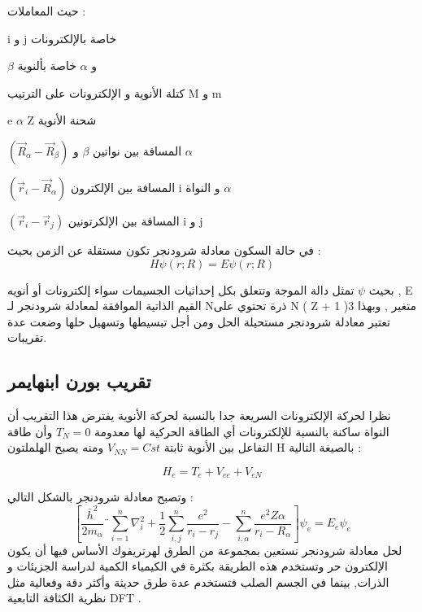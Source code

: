 حيث المعاملات :
\begin{list}{}{}
	
	\item 
	i و j خاصة بالإلكترونات
	\item 
	$ \beta $ و  $ \alpha $ خاصة بألنوية
	\item 
	كتلة الأنوية  و الإلكترونات على الترتيب M و m
	\item 
	e $ \alpha $ Z شحنة الأنوية
	\item 
	$(\vec{R}_{\alpha} - \vec{R}_{\beta})$	المسافة بين نواتين $ \beta $ و  $ \alpha $  
	\item 
	$(\vec{r}_{i} - \vec{R}_{\alpha})$ 	المسافة بين الإلكترون i و النواة $ \alpha $
	
	\item 
	$(\vec{r}_{i} - \vec{r}_{j})$	المسافة  بين الإلكرتونين i و j
\end{list}

في حالة السكون معادلة  شرودنجر تكون مستقلة عن الزمن بحيث :
\begin{equation}\label{}
	H \psi (r;R) = E \psi (r;R)
\end{equation}

بحيث $\psi$ تمثل دالة الموجة وتتعلق بكل إحداثيات الجسيمات سواء إلكترونات أو أنويه , E  القيم الذاتية الموافقة لمعادلة شرودنجر لـ  Nذرة تحتوي على N ( Z + 1 )3 متغير , وبهذا تعتبر معادلة  شرودنجر مستحيلة الحل ومن أجل تبسيطها وتسهيل حلها وضعت عدة تقريبات.


\subsection{ تقريب بورن ابنهايمر }

نظرا لحركة الإلكترونات السريعة جدا بالنسبة لحركة الأنوية  يفترض هذا التقريب أن  النواة ساكنة بالنسبة للإلكترونات أي الطاقة الحركية لها معدومة  $T_{N} = 0$ وأن طاقة التفاعل بين الأنوية ثابتة $ V_{NN} = Cst $ ومنه يصبح الهلملتون H بالصيغة التالية :

\begin{equation}\label{}
	H_{e} = T_{e} + V_{ee} + V_{eN}
\end{equation}

وتصبح معادلة شرودنجر بالشكل التالي :
\begin{equation}\label{}
	\left[\frac{ \bar{h} ^{2}  }{ 2m_{\alpha} }¨\sum_{i=1}^n  \nabla_{i}^{2} + \dfrac{1}{2} \sum_{i , j}^n \dfrac{e^{2}}{r_{i} - r_{j}} - \sum_{i , \alpha}^n \dfrac {e^{2} Z \alpha }{r_{i} - R_{\alpha}}\right] \psi_{e} = E_{e} \psi_{e}
\end{equation}
لحل معادلة  شرودنجر نستعين بمجموعة من الطرق لهرتريفوك  الأساس فيها أن يكون الإلكترون  حر وتستخدم هذه الطريقة بكثرة في الكيمياء الكمية لدراسة الجزيئات و الذرات, بينما في الجسم الصلب فتستخدم عدة طرق حديثة وأكثر دقة وفعالية مثل نظرية الكثافة التابعية  DFT .
